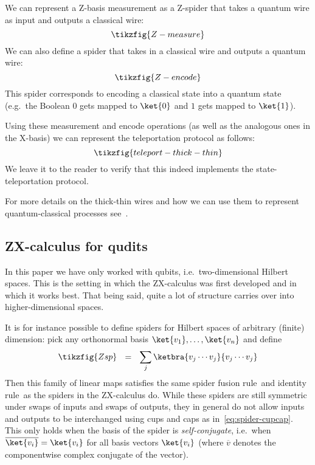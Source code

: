 \documentclass[a4paper,onecolumn,superscriptaddress,11pt,%
				unpublished,%
				allowfontchageintitle,%
				]{quantumarticle}
\begin{document}
We can represent a Z-basis measurement as a Z-spider that takes a quantum wire as input and outputs a classical wire:
\begin{equation}
	\tikzfig{Z-measure}
\end{equation}
We can also define a spider that takes in a classical wire and outputs a quantum wire:
\begin{equation}
	\tikzfig{Z-encode}
\end{equation}
This spider corresponds to encoding a classical state into a quantum state (e.g.~the Boolean $0$ gets mapped to $\ket{0}$ and $1$ gets mapped to $\ket{1}$).

Using these measurement and encode operations (as well as the analogous ones in the X-basis) we can represent the teleportation protocol as follows:
\begin{equation}
	\tikzfig{teleport-thick-thin}
\end{equation}
We leave it to the reader to verify that this indeed implements the state-teleportation protocol.

For more details on the thick-thin wires and how we can use them to represent quantum-classical processes see~\cite[Chapter~8]{CKbook}.

\subsection{ZX-calculus for qudits}\label{sec:qudits}

In this paper we have only worked with qubits, i.e.~two-dimensional Hilbert spaces. This is the setting in which the ZX-calculus was first developed and in which it works best. That being said, quite a lot of structure carries over into higher-dimensional spaces.

It is for instance possible to define spiders for Hilbert spaces of arbitrary (finite) dimension: pick any orthonormal basis $\ket{v_1},\ldots,\ket{v_n}$ and define
\begin{equation}
	\tikzfig{Zsp} \ \ = \ \ \sum_j \ketbra{v_j\cdots v_j}{v_j\cdots v_j}
\end{equation}
Then this family of linear maps satisfies the same spider fusion rule~\SpiderRule and identity rule~\IdRule as the spiders in the ZX-calculus do. While these spiders are still symmetric under swaps of inputs and swaps of outputs, they in general do not allow inputs and outputs to be interchanged using cups and caps as in~\eqref{eq:spider-cupcap}. This only holds when the basis of the spider is \emph{self-conjugate}, i.e.~when $\overline{\ket{v_i}} = \ket{v_i}$ for all basis vectors $\ket{v_i}$ (where $\overline{v}$ denotes the componentwise complex conjugate of the vector).
\end{document}
